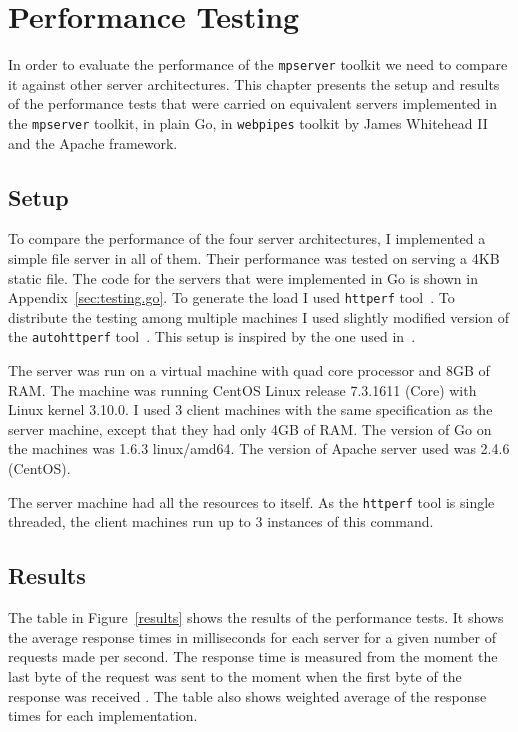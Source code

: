 \section{Performance Testing}
\label{sec:test}
In order to evaluate the performance of the \texttt{mpserver} toolkit we 
need to compare it against other server architectures.
This chapter presents the setup and results of the performance tests
that were carried on equivalent servers implemented in the \texttt{mpserver} toolkit,
in plain Go, in \texttt{webpipes} toolkit by James Whitehead II~\cite{whitehead} 
and the Apache framework.

\subsection{Setup}
To compare the performance of the four server architectures, I 
implemented a simple file server in all of them. Their performance 
was tested on serving a 4KB static file. The code for the servers 
that were implemented in Go is shown in Appendix~\ref{sec:testing.go}. To generate 
the load I used \texttt{httperf} tool~\cite{httperf}. To distribute 
the testing among multiple machines I used slightly modified version
of the \texttt{autohttperf} tool~\cite{whitehead}.
This setup is inspired by the one used in~\cite{whitehead}.

The server was run on a virtual machine with quad core processor and 
8GB of RAM. The machine was running CentOS Linux release 7.3.1611 (Core)
with Linux kernel 3.10.0.
I used 3 client machines with the same specification as the server machine, 
except that they had only 4GB of RAM. The version of Go on the machines was
1.6.3 linux/amd64. The version of Apache server used was 2.4.6 (CentOS).

The server machine had all the resources to itself. As the \texttt{httperf}
tool is single threaded, the client machines run up to 3 instances
of this command.

\subsection{Results}
The table in Figure~\ref{results} shows the results of the performance tests.
It shows the average response times in milliseconds for each server for
a given number of requests made per second. The response time is measured from the 
moment the last byte of the request was sent to the moment when the first 
byte of the response was received \cite{httperfdoc}. The table also shows weighted 
average of the response times for each implementation.

